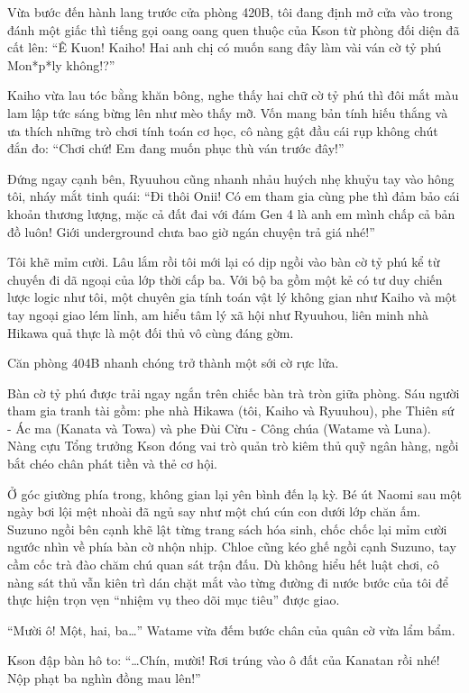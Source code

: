 \documentclass[../main.tex]{subfiles}
\begin{document}
Vừa bước đến hành lang trước cửa phòng 420B, tôi đang định mở cửa vào trong đánh một giấc thì tiếng gọi oang oang quen thuộc của Kson từ phòng đối diện đã cất lên: ``Ê Kuon! Kaiho! Hai anh chị có muốn sang đây làm vài ván cờ tỷ phú Mon*p*ly không!?''

Kaiho vừa lau tóc bằng khăn bông, nghe thấy hai chữ cờ tỷ phú thì đôi mắt màu lam lập tức sáng bừng lên như mèo thấy mỡ. Vốn mang bản tính hiếu thắng và ưa thích những trò chơi tính toán cơ học, cô nàng gật đầu cái rụp không chút đắn đo: ``Chơi chứ! Em đang muốn phục thù ván trước đây!''

Đứng ngay cạnh bên, Ryuuhou cũng nhanh nhảu huých nhẹ khuỷu tay vào hông tôi, nháy mắt tinh quái: ``Đi thôi Onii! Có em tham gia cùng phe thì đảm bảo cái khoản thương lượng, mặc cả đất đai với đám Gen 4 là anh em mình chấp cả bản đồ luôn! Giới underground chưa bao giờ ngán chuyện trả giá nhé!''

Tôi khẽ mỉm cười. Lâu lắm rồi tôi mới lại có dịp ngồi vào bàn cờ tỷ phú kể từ chuyến đi dã ngoại của lớp thời cấp ba. Với bộ ba gồm một kẻ có tư duy chiến lược logic như tôi, một chuyên gia tính toán vật lý không gian như Kaiho và một tay ngoại giao lém lỉnh, am hiểu tâm lý xã hội như Ryuuhou, liên minh nhà Hikawa quả thực là một đối thủ vô cùng đáng gờm.

Căn phòng 404B nhanh chóng trở thành một sới cờ rực lửa.

Bàn cờ tỷ phú được trải ngay ngắn trên chiếc bàn trà tròn giữa phòng. Sáu người tham gia tranh tài gồm: phe nhà Hikawa (tôi, Kaiho và Ryuuhou), phe Thiên sứ - Ác ma (Kanata và Towa) và phe Đùi Cừu - Công chúa (Watame và Luna). Nàng cựu Tổng trưởng Kson đóng vai trò quản trò kiêm thủ quỹ ngân hàng, ngồi bắt chéo chân phát tiền và thẻ cơ hội.

Ở góc giường phía trong, không gian lại yên bình đến lạ kỳ. Bé út Naomi sau một ngày bơi lội mệt nhoài đã ngủ say như một chú cún con dưới lớp chăn ấm. Suzuno ngồi bên cạnh khẽ lật từng trang sách hóa sinh, chốc chốc lại mỉm cười ngước nhìn về phía bàn cờ nhộn nhịp. Chloe cũng kéo ghế ngồi cạnh Suzuno, tay cầm cốc trà đào chăm chú quan sát trận đấu. Dù không hiểu hết luật chơi, cô nàng sát thủ vẫn kiên trì dán chặt mắt vào từng đường đi nước bước của tôi để thực hiện trọn vẹn ``nhiệm vụ theo dõi mục tiêu'' được giao.

``Mười ô! Một, hai, ba\dots'' Watame vừa đếm bước chân của quân cờ vừa lẩm bẩm.

Kson đập bàn hô to: ``\dots Chín, mười! Rơi trúng vào ô đất của Kanatan rồi nhé! Nộp phạt ba nghìn đồng mau lên!''
\end{document}
